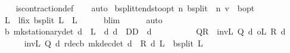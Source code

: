 \begin{isabellebody}
\ \ \isamarkupfalse%
\ is{\isacharunderscore}{\kern0pt}contraction{\isacharunderscore}{\kern0pt}def\isanewline
\ \ \isamarkupfalse%
\ auto%
\endisatagproof
{\isafoldproof}%
%
\isadelimproof
\isanewline
%
\endisadelimproof
\isanewline
{}\isamarkupfalse%
\ {\isasymL}\isactrlsub b{\isacharunderscore}{\kern0pt}split{\isacharunderscore}{\kern0pt}tendsto{\isacharunderscore}{\kern0pt}opt{\isacharcolon}{\kern0pt}\ {\isachardoublequoteopen}{\isacharparenleft}{\kern0pt}{\isasymlambda}n{\isachardot}{\kern0pt}\ {\isacharparenleft}{\kern0pt}{\isasymL}\isactrlsub b{\isacharunderscore}{\kern0pt}split\ {\isacharcircum}{\kern0pt}{\isacharcircum}{\kern0pt}\ n{\isacharparenright}{\kern0pt}\ v{\isacharparenright}{\kern0pt}\ {\isasymlonglonglongrightarrow}\ {\isasymnu}\isactrlsub b{\isacharunderscore}{\kern0pt}opt{\isachardoublequoteclose}\isanewline
%
\isadelimproof
%
\endisadelimproof
%
\isatagproof
{}\isamarkupfalse%
\ {\isacharminus}{\kern0pt}\isanewline
\ \ \isamarkupfalse%
\ L\ \ l{\isacharunderscore}{\kern0pt}fix{\isacharcolon}{\kern0pt}\ {\isachardoublequoteopen}{\isasymL}\isactrlsub b{\isacharunderscore}{\kern0pt}split\ L\ {\isacharequal}{\kern0pt}\ L{\isachardoublequoteclose}\isanewline
\ \ \ \ \isamarkupfalse%
\ {\isasymL}\isactrlsub b{\isacharunderscore}{\kern0pt}lim{\isacharparenleft}{\kern0pt}{}{\isacharparenright}{\kern0pt}\isanewline
\ \ \ \ \isamarkupfalse%
\ auto\isanewline
\ \ \isamarkupfalse%
\ {\isachardoublequoteopen}{\isasymnu}\isactrlsub b\ {\isacharparenleft}{\kern0pt}mk{\isacharunderscore}{\kern0pt}stationary{\isacharunderscore}{\kern0pt}det\ d{\isacharparenright}{\kern0pt}\ {\isasymle}\ L{\isachardoublequoteclose}\ \ d{\isacharcolon}{\kern0pt}\ {\isachardoublequoteopen}d\ {\isasymin}\ D\isactrlsub D{\isachardoublequoteclose}\ \ d\isanewline
\ \ \isamarkupfalse%
\ {\isacharminus}{\kern0pt}\isanewline
\ \ \ \ \isamarkupfalse%
\ {\isacharquery}{\kern0pt}QR\ {\isacharequal}{\kern0pt}\ {\isachardoublequoteopen}inv\isactrlsub L\ {\isacharparenleft}{\kern0pt}Q\ d{\isacharparenright}{\kern0pt}\ o\isactrlsub L\ R\ d{\isachardoublequoteclose}\isanewline
\ \ \ \ \isamarkupfalse%
\ {\isachardoublequoteopen}inv\isactrlsub L\ {\isacharparenleft}{\kern0pt}Q\ d{\isacharparenright}{\kern0pt}\ {\isacharparenleft}{\kern0pt}r{\isacharunderscore}{\kern0pt}dec\isactrlsub b\ {\isacharparenleft}{\kern0pt}mk{\isacharunderscore}{\kern0pt}dec{\isacharunderscore}{\kern0pt}det\ d{\isacharparenright}{\kern0pt}\ {\isacharplus}{\kern0pt}\ R\ d\ L{\isacharparenright}{\kern0pt}\ {\isasymle}\ {\isasymL}\isactrlsub b{\isacharunderscore}{\kern0pt}split\ L{\isachardoublequoteclose}\isanewline

\end{isabellebody}

